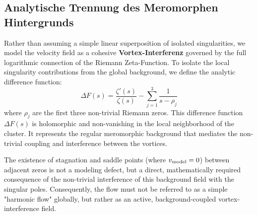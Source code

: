 \documentclass[11pt,a4paper]{article}
\theoremstyle{definition}
\begin{document}
	\subsection{Analytische Trennung des Meromorphen Hintergrunds}
	Rather than assuming a simple linear superposition of isolated singularities, we model the velocity field as a cohesive \textbf{Vortex-Interferenz} governed by the full logarithmic connection of the Riemann Zeta-Function. To isolate the local singularity contributions from the global background, we define the analytic difference function:
	\begin{equation}
		\Delta F(s) = \frac{\zeta'(s)}{\zeta(s)} - \sum_{j=1}^{3} \frac{1}{s-\rho_j}
	\end{equation}
	where $\rho_j$ are the first three non-trivial Riemann zeros. This difference function $\Delta F(s)$ is holomorphic and non-vanishing in the local neighborhood of the cluster. It represents the regular meromorphic background that mediates the non-trivial coupling and interference between the vortices. 
	
	The existence of stagnation and saddle points (where $v_{\rm model} = 0$) between adjacent zeros is not a modeling defect, but a direct, mathematically required consequence of the non-trivial interference of this background field with the singular poles. Consequently, the flow must not be referred to as a simple "harmonic flow" globally, but rather as an active, background-coupled vortex-interference field.
	
\end{document}
